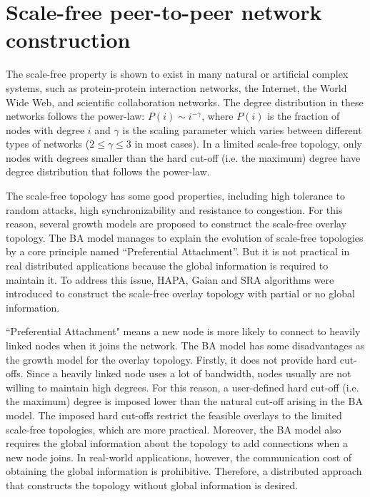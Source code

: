 \section{Scale-free peer-to-peer network construction} \label{sec:3.3}
The scale-free property is shown to exist in many natural or artificial complex systems, such as protein-protein interaction networks\cite{jeong2001lethality}, the Internet\cite{faloutsos1999power}, the World Wide Web\cite{barabasi1999diameter}, and scientific collaboration networks\cite{barabasi2002evolution}. The degree distribution in these networks follows the power-law: $P(i) \sim  i^{-\gamma}$, where $P(i)$ is the fraction of nodes with degree $i$ and $\gamma$ is the scaling parameter which varies between different types of networks ($2 \leq \gamma \leq 3$ in most cases). In a limited scale-free topology, only nodes with degrees smaller than the hard cut-off (i.e. the maximum) degree have degree distribution that follows the power-law.

The scale-free topology has some good properties, including high tolerance to random attacks\cite{albert2000error}, high synchronizability\cite{korniss2007synchronization} and resistance to congestion\cite{toroczkai2004network}. For this reason, several growth models are proposed to construct the scale-free overlay topology. The BA model\cite{barabasi1999emergence} manages to explain the evolution of scale-free topologies by a core principle named ``Preferential Attachment''. But it is not practical in real distributed applications because the global information is required to maintain it. To address this issue, HAPA\cite{guclu2009limited}, Gaian\cite{bent2008dynamic} and SRA\cite{bulut2014constructing} algorithms were introduced to construct the scale-free overlay topology with partial or no global information.

``Preferential Attachment"\cite{barabasi1999emergence} means a new node is more likely to connect to heavily linked nodes when it joins the network. The BA model has some disadvantages as the growth model for the overlay topology. Firstly, it does not provide hard cut-offs. Since a heavily linked node uses a lot of bandwidth, nodes usually are not willing to maintain high degrees. For this reason, a user-defined hard cut-off (i.e. the maximum) degree is imposed lower than the natural cut-off arising in the BA model. The imposed hard cut-offs restrict the feasible overlays to the limited scale-free topologies, which are more practical. Moreover, the BA model also requires the global information about the topology to add connections when a new node joins. In real-world applications, however, the communication cost of obtaining the global information is prohibitive. Therefore, a distributed approach that constructs the topology without global information is desired.

